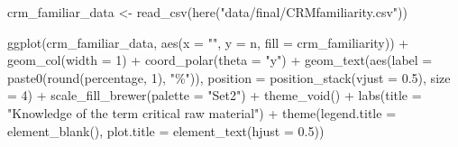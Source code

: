 \documentclass[
  letterpaper,
  DIV=11,
  numbers=noendperiod]{scrartcl}
\newenvironment{Shaded}{\begin{snugshade}}{\end{snugshade}}
\newcommand{\AttributeTok}[1]{\textcolor[rgb]{0.40,0.45,0.13}{#1}}
\newcommand{\DecValTok}[1]{\textcolor[rgb]{0.68,0.00,0.00}{#1}}
\newcommand{\FloatTok}[1]{\textcolor[rgb]{0.68,0.00,0.00}{#1}}
\newcommand{\FunctionTok}[1]{\textcolor[rgb]{0.28,0.35,0.67}{#1}}
\newcommand{\NormalTok}[1]{\textcolor[rgb]{0.00,0.23,0.31}{#1}}
\newcommand{\OtherTok}[1]{\textcolor[rgb]{0.00,0.23,0.31}{#1}}
\newcommand{\SpecialCharTok}[1]{\textcolor[rgb]{0.37,0.37,0.37}{#1}}
\newcommand{\StringTok}[1]{\textcolor[rgb]{0.13,0.47,0.30}{#1}}
\begin{document}
\begin{Shaded}
\begin{Highlighting}[]
\NormalTok{crm\_familiar\_data }\OtherTok{\textless{}{-}} \FunctionTok{read\_csv}\NormalTok{(}\FunctionTok{here}\NormalTok{(}\StringTok{"data/final/CRMfamiliarity.csv"}\NormalTok{))}

\FunctionTok{ggplot}\NormalTok{(crm\_familiar\_data, }\FunctionTok{aes}\NormalTok{(}\AttributeTok{x =} \StringTok{""}\NormalTok{, }\AttributeTok{y =}\NormalTok{ n, }\AttributeTok{fill =}\NormalTok{ crm\_familiarity)) }\SpecialCharTok{+}
  \FunctionTok{geom\_col}\NormalTok{(}\AttributeTok{width =} \DecValTok{1}\NormalTok{) }\SpecialCharTok{+}
  \FunctionTok{coord\_polar}\NormalTok{(}\AttributeTok{theta =} \StringTok{"y"}\NormalTok{) }\SpecialCharTok{+}
  \FunctionTok{geom\_text}\NormalTok{(}\FunctionTok{aes}\NormalTok{(}\AttributeTok{label =} \FunctionTok{paste0}\NormalTok{(}\FunctionTok{round}\NormalTok{(percentage, }\DecValTok{1}\NormalTok{), }\StringTok{"\%"}\NormalTok{)),}
            \AttributeTok{position =} \FunctionTok{position\_stack}\NormalTok{(}\AttributeTok{vjust =} \FloatTok{0.5}\NormalTok{),}
            \AttributeTok{size =} \DecValTok{4}\NormalTok{) }\SpecialCharTok{+}
  \FunctionTok{scale\_fill\_brewer}\NormalTok{(}\AttributeTok{palette =} \StringTok{"Set2"}\NormalTok{) }\SpecialCharTok{+}
  \FunctionTok{theme\_void}\NormalTok{() }\SpecialCharTok{+}
  \FunctionTok{labs}\NormalTok{(}\AttributeTok{title =} \StringTok{"Knowledge of the term critical raw material"}\NormalTok{) }\SpecialCharTok{+} 
  \FunctionTok{theme}\NormalTok{(}\AttributeTok{legend.title =} \FunctionTok{element\_blank}\NormalTok{(), }\AttributeTok{plot.title =} \FunctionTok{element\_text}\NormalTok{(}\AttributeTok{hjust =} \FloatTok{0.5}\NormalTok{))}
\end{Highlighting}
\end{Shaded}
\end{document}
